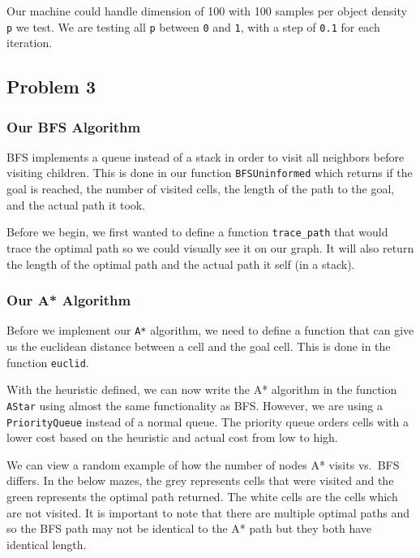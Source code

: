 \documentclass[11pt]{article}
\begin{document}
Our machine could handle dimension of 100 with 100 samples per object
density \texttt{p} we test. We are testing all \texttt{p} between
\texttt{0} and \texttt{1}, with a step of \texttt{0.1} for each
iteration.

    \hypertarget{problem-3}{%
\subsection{Problem 3}\label{problem-3}}

\hypertarget{our-bfs-algorithm}{%
\subsubsection{Our BFS Algorithm}\label{our-bfs-algorithm}}

BFS implements a queue instead of a stack in order to visit all
neighbors before visiting children. This is done in our function
\texttt{BFSUninformed} which returns if the goal is reached, the number
of visited cells, the length of the path to the goal, and the actual
path it took.

    Before we begin, we first wanted to define a function
\texttt{trace\_path} that would trace the optimal path so we could
visually see it on our graph. It will also return the length of the
optimal path and the actual path it self (in a stack).

    \hypertarget{our-a-algorithm}{%
\subsubsection{Our A* Algorithm}\label{our-a-algorithm}}

Before we implement our \texttt{A*} algorithm, we need to define a
function that can give us the euclidean distance between a cell and the
goal cell. This is done in the function \texttt{euclid}.

    With the heuristic defined, we can now write the A* algorithm in the
function \texttt{AStar} using almost the same functionality as BFS.
However, we are using a \texttt{PriorityQueue} instead of a normal
queue. The priority queue orders cells with a lower cost based on the
heuristic and actual cost from low to high.

    We can view a random example of how the number of nodes A* visits
vs.~BFS differs. In the below mazes, the grey represents cells that were
visited and the green represents the optimal path returned. The white
cells are the cells which are not visited. It is important to note that
there are multiple optimal paths and so the BFS path may not be
identical to the A* path but they both have identical length.
\end{document}
